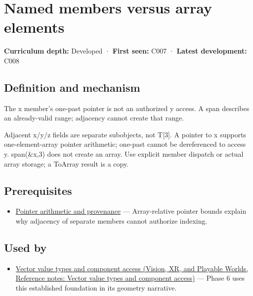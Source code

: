 \hypertarget{appendix-3f7e15effba6}{}\label{referencestart:appendix-3f7e15effba6}
\section{Named members versus array elements}\label{appendix-3f7e15effba6-named-members-versus-array-elements}

\textbf{Curriculum depth:} Developed · \textbf{First seen:} C007 · \textbf{Latest development:} C008

\subsection{Definition and mechanism}\label{appendix-3f7e15effba6-definition-and-mechanism}

The x member's one-past pointer is not an authorized y access. A span describes an already-valid range; adjacency cannot create that range.

Adjacent x/y/z fields are separate subobjects, not T{[}3{]}. A pointer to x supports one-element-array pointer arithmetic; one-past cannot be dereferenced to access y. span(\&x,3) does not create an array. Use explicit member dispatch or actual array storage; a ToArray result is a copy.

\subsection{Prerequisites}\label{appendix-3f7e15effba6-prerequisites}

\begin{itemize}
\tightlist
\item
  \hyperref[appendix-6af5921bc853]{Pointer arithmetic and provenance} --- Array-relative pointer bounds explain why adjacency of separate members cannot authorize indexing.
\end{itemize}

\subsection{Used by}\label{appendix-3f7e15effba6-used-by}

\begin{itemize}
\tightlist
\item
  \href{../07-Vision-XR-and-Playable-Worlds/main.pdf\#nameddest=appendix-37a39984ba66}{Vector value types and component access (Vision, XR, and Playable Worlds, Reference notes: Vector value types and component access)} --- Phase 6 uses this established foundation in its geometry narrative.
\end{itemize}

